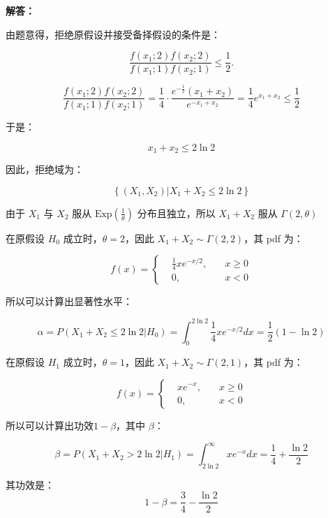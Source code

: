 \documentclass[12pt,a4paper]{article}
\begin{document}
\begin{answerbox}
\textbf{解答：}

由题意得，拒绝原假设并接受备择假设的条件是：

\[
\frac{f(x_1;2)f(x_2;2)}{f(x_1;1)f(x_2;1)} \leq \frac{1}{2}.
\]

$$
\frac{f(x_1;2)f(x_2;2)}{f(x_1;1)f(x_2;1)} = \frac{1}{4} \cdot \frac{e^{-\frac{1}{2}}(x_1+x_2)}{e^{-{x_1+x_2}}} = \frac{1}{4} e^{x_1+x_2} \leq \frac{1}{2}
$$

于是：

$$
x_1+x_2 \leq 2\ln 2
$$

因此，拒绝域为：

$$
\left\{(X_1, X_2) | X_1 + X_2 \leq 2\ln 2\right\}
$$

由于 $X_1$ 与 $X_2$ 服从 $\text{Exp}(\frac{1}{\theta})$ 分布且独立，所以 $X_1 + X_2$ 服从 $\varGamma(2, \theta)$

在原假设 $H_0$ 成立时，$\theta = 2$，因此 $X_1 + X_2 \sim \varGamma(2, 2)$，其 pdf 为：

$$
f(x) = \left\{\begin{aligned}
 &\frac{1}{4}xe^{-x/2}, \quad& x \geq 0 \\
 & 0, \quad& x < 0
\end{aligned}\right.
$$


所以可以计算出显著性水平：

$$
\alpha = P\left(X_1 + X_2 \leq 2\ln 2 | H_0\right) = \int_{0}^{2\ln 2} \frac{1}{4} xe^{-x/2} dx = \frac{1}{2}(1-\ln 2)
$$

在原假设 $H_1$ 成立时，$\theta = 1$，因此 $X_1 + X_2 \sim \varGamma(2, 1)$，其 pdf 为：

$$
f(x) = \left\{\begin{aligned}
 & xe^{-x}, \quad& x \geq 0 \\
 & 0, \quad& x < 0
\end{aligned}\right.
$$

所以可以计算出功效$1-\beta$，其中 $\beta$：

$$
\beta = P\left(X_1 + X_2 > 2\ln 2 | H_1\right) = \int_{2\ln 2}^{\infty} x e^{-x} dx = \frac{1}{4}+\frac{\ln 2}{2}
$$

其功效是：$$1 - \beta = \frac{3}{4} - \frac{\ln 2}{2}$$

\end{answerbox}
\end{document}
